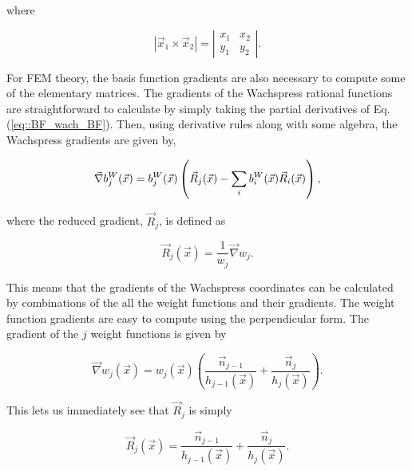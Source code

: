 \noindent where

\begin{equation}
\label{eq::BF_wach_cross}
|\vec{x}_{1} \times \vec{x}_2| = 
\left|  
\begin{array}{ccc}
x_1 & x_2 \\
y_1 & y_2
\end{array}
\right| .
\end{equation}

For FEM theory, the basis function gradients are also necessary to compute some of the elementary matrices. The gradients of the Wachspress rational functions are straightforward to calculate by simply taking the partial derivatives of Eq. (\ref{eq::BF_wach_BF}). Then, using derivative rules along with some algebra, the Wachspress gradients are given by,

\begin{equation}
\label{eq::BF_wach_gradient}
 \vec{\nabla} b_{j}^{W}(\vec{x}) = b_{j}^{W} (\vec{x}) \left( \vec{R}_j  (\vec{x})- \sum\displaylimits_{i}   b_{i}^{W} (\vec{x}) \vec{R}_i (\vec{x}) \right) ,
\end{equation}

\noindent where the reduced gradient, $\vec{R}_j$, is defined as

\begin{equation}
\label{eq::BF_wach_reduced_grad}
\vec{R}_j (\vec{x})  = \frac{1}{w_j} \vec{\nabla} w_j .
\end{equation}

\noindent This means that the gradients of the Wachspress coordinates can be calculated by combinations of the all the weight functions and their gradients. The weight function gradients are easy to compute using the perpendicular form. The gradient of the $j$ weight functions is given by

\begin{equation}
\label{eq::BF_wach_grad_perpdist}
 \vec{\nabla} w_j (\vec{x}) = w_j (\vec{x})  \left(  \frac{\vec{n}_{j-1}}{h_{j-1} (\vec{x})} + \frac{\vec{n}_{j}}{h_{j} (\vec{x})} \right) .
\end{equation}

\noindent This lets us immediately see that $\vec{R}_j$ is simply

\begin{equation}
\label{eq::BF_wach_reduce_grad_form}
\vec{R}_j (\vec{x})  = \frac{\vec{n}_{j-1}}{h_{j-1} (\vec{x})} + \frac{\vec{n}_{j}}{h_{j} (\vec{x})}.
\end{equation}

